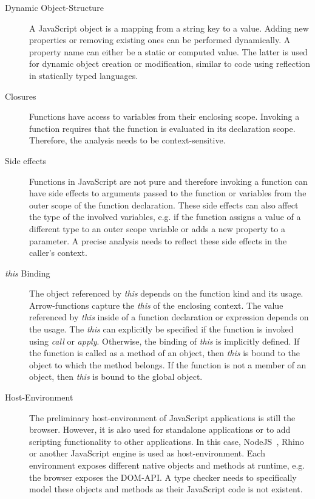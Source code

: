 \begin{description}
	\item[Dynamic Object-Structure] A JavaScript object is a mapping from a string key to a value. Adding new properties or removing existing ones can be performed dynamically. A property name can either be a static or computed value. The latter is used for dynamic object creation or modification, similar to code using reflection in statically typed languages. 
	
	\item[Closures] Functions have access to variables from their enclosing scope. Invoking a function requires that the function is evaluated in its declaration scope. Therefore, the analysis needs to be context-sensitive.

	\item[Side effects] Functions in JavaScript are not pure and therefore invoking a function can have side effects to arguments passed to the function or variables from the outer scope of the function declaration. These side effects can also affect the type of the involved variables, e.g. if the function assigns a value of a different type to an outer scope variable or adds a new property to a parameter. A precise analysis needs to reflect these side effects in the caller's context.
	
	\item[\textit{this} Binding] The object referenced by \textit{this} depends on the  function kind and its usage. Arrow-functions capture the \textit{this} of the enclosing context. The value referenced by \textit{this} inside of a function declaration or expression depends on the usage. The \textit{this} can explicitly be specified if the function is invoked using \textit{call} or \textit{apply}. Otherwise, the binding of \textit{this} is implicitly defined. If the function is called as a method of an object, then \textit{this} is bound to the object to which the method belongs. If the function is not a member of an object, then \textit{this} is bound to the global object. 

	\item[Host-Environment] The preliminary host-environment of JavaScript applications is still the browser. However, it is also used for standalone applications or to add scripting functionality to other applications. In this case, NodeJS~\cite{NodeJS}, Rhino~\cite{Rhino} or another JavaScript engine is used as host-environment. Each environment exposes different native objects and methods at runtime, e.g. the browser exposes the DOM-API. A type checker needs to specifically model these objects and methods as their JavaScript code is not existent.
\end{description}

